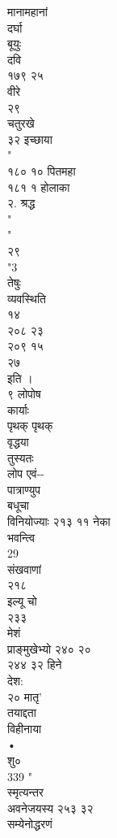 \documentclass[11pt, openany]{book}
\begin{document}
{{{{{{{{{{{{{{{{{{{{{{{{{{{{{{{{{{{{{{{{{{{{{{{{{{{{{{{{{{{{{{{{{{{{{{{{{{{{{{{{{{{{{{{{{{{{{{{{{{{{{{{{{{{{{{{{{{{{{{{{{{{{{{{{{{{{{{{{{{{{{{{{{{{{{{{{{{{{{{{{{{{{{{{{{{मानामहानां\\
दर्घा\\
बूयुः\\
दवि\\
१७९ २५\\
वीरे\\
२९\\
चतुरखे\\
३२ इच्छाया\\
"\\
१८० १० पितमहा\\
१८१ १ होलाका\\
२. श्रद्ध\\
"\\
"\\
२९\\
"3\\
तेषुः\\
व्यवस्थिति\\
१४\\
२०८ २३\\
२०९ १५\\
२७\\
}{इति}{ ।\\
९ लोपोष\\
कार्याः\\
पृथक् पृथक्\\
वृद्धया\\
तुस्यतः\\
लोप एवं-\/-\\
पात्राण्युप\\
बधूचा\\
विनियोज्याः २१३ ११ नेका\\
भवन्त्वि\\
29\\
संखवाणां\\
२१८\\
इल्यू चो\\
२३३\\
मेशं\\
प्राङ्मुखेभ्यो २४० २०\\
२४४ ३२ हिने\\
देश:\\
२० मातृ'\\
तयाद्दता\\
विहीनाया\\
•\\
शु०\\
339 "\\
स्मृत्यन्तर\\
अवनेजयस्य २५३ ३२\\
सम्येनोद्धरणं\\
}}}}}}}}}}}}}}}}}}}}}}}}}}}}}}}}}}}}}}}}}}}}}}}}}}}}}}}}}}}}}}}}}}}}}}}}}}}}}}}}}}}}}}}}}}}}}}}}}}}}}}}}}}}}}}}}}}}}}}}}}}}}}}}}}}}}}}}}}}}}}}}}}}}}}}}}}}}}}}}}}}}}}}}}}}
\end{document}
